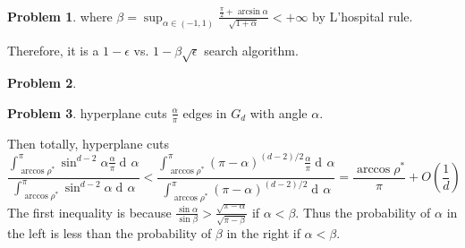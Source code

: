 \documentclass[a4paper]{article}
\theoremstyle{definition}
\newtheorem{problem}{Problem}
\theoremstyle{plain}
\newcommand{\Ebb}{\mathbb E}
\newcommand{\dps}{\displaystyle}
\newcommand{\<}{\left<}
\renewcommand{\>}{\right>}
\numberwithin{equation}{problem}
\DeclareMathOperator{\dd}{d\!}
\begin{document}
\begin{problem}
  where  $ \beta=\sup_{\alpha\in(-1,1)}\frac{\frac{\pi}{2}+\arcsin \alpha}{\sqrt{1+\alpha}}<+\infty $ by L'hospital rule.

  Therefore, it is a  $ 1-\epsilon $ vs.  $ 1-\beta\sqrt{\epsilon} $ search algorithm.




\end{problem}
\begin{problem}
  
\end{problem}
\begin{problem}
  hyperplane cuts  $ \frac{\alpha}{\pi} $ edges in  $ G_d $ with angle  $ \alpha $.
  
  Then totally, hyperplane cuts 
  \[\frac{\int_{\arccos\rho^*}^\pi \sin^{d-2}\alpha\frac{\alpha}{\pi}\dd \alpha}{\int_{\arccos\rho^*}^\pi\sin^{d-2}\alpha\dd \alpha}<\frac{\int_{\arccos\rho^*}^\pi(\pi-\alpha)^{(d-2)/2}\frac{\alpha}{\pi}\dd\alpha}{\int_{\arccos\rho^*}^\pi(\pi-\alpha)^{(d-2)/2}\dd \alpha}=\frac{\arccos\rho^*}{\pi}+O(\frac{1}{d})\]
  The first inequality is because  $ \dps\frac{\sin \alpha}{\sin \beta}>\frac{\sqrt{\pi-\alpha}}{\sqrt{\pi-\beta}} $ if  $ \alpha<\beta $. Thus the probability of  $ \alpha $ in the left is less than the probability of  $ \beta $ in the right if  $ \alpha<\beta $.

\end{problem}
\end{document}
